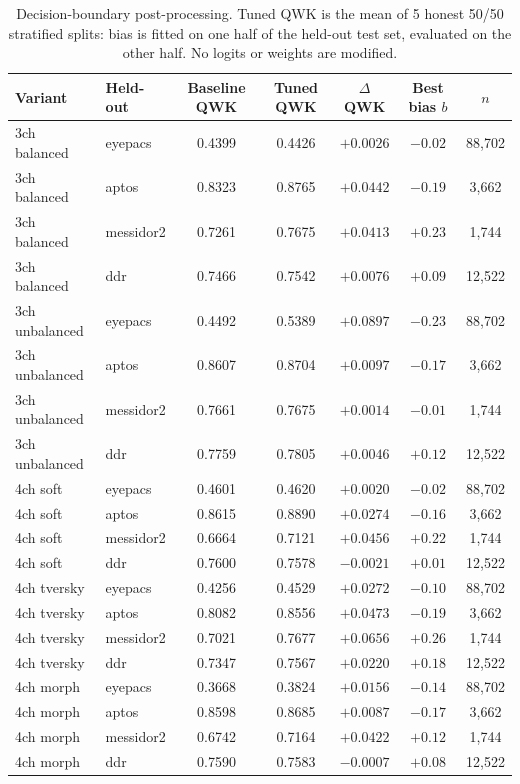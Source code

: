 \documentclass[11pt]{article}
\begin{document}
\begin{table}[ht]
\centering
\small
\begin{tabular}{llccccc}
\toprule
Variant & Held-out & Baseline QWK & Tuned QWK & $\Delta$QWK & Best bias $b$ & $n$ \\
\midrule
3ch balanced   & eyepacs   & 0.4399 & 0.4426 & $+0.0026$ & $-0.02$ & 88{,}702 \\
3ch balanced   & aptos     & 0.8323 & 0.8765 & $+0.0442$ & $-0.19$ &  3{,}662 \\
3ch balanced   & messidor2 & 0.7261 & 0.7675 & $+0.0413$ & $+0.23$ &  1{,}744 \\
3ch balanced   & ddr       & 0.7466 & 0.7542 & $+0.0076$ & $+0.09$ & 12{,}522 \\
3ch unbalanced & eyepacs   & 0.4492 & 0.5389 & $+0.0897$ & $-0.23$ & 88{,}702 \\
3ch unbalanced & aptos     & 0.8607 & 0.8704 & $+0.0097$ & $-0.17$ &  3{,}662 \\
3ch unbalanced & messidor2 & 0.7661 & 0.7675 & $+0.0014$ & $-0.01$ &  1{,}744 \\
3ch unbalanced & ddr       & 0.7759 & 0.7805 & $+0.0046$ & $+0.12$ & 12{,}522 \\
4ch soft       & eyepacs   & 0.4601 & 0.4620 & $+0.0020$ & $-0.02$ & 88{,}702 \\
4ch soft       & aptos     & 0.8615 & 0.8890 & $+0.0274$ & $-0.16$ &  3{,}662 \\
4ch soft       & messidor2 & 0.6664 & 0.7121 & $+0.0456$ & $+0.22$ &  1{,}744 \\
4ch soft       & ddr       & 0.7600 & 0.7578 & $-0.0021$ & $+0.01$ & 12{,}522 \\
4ch tversky    & eyepacs   & 0.4256 & 0.4529 & $+0.0272$ & $-0.10$ & 88{,}702 \\
4ch tversky    & aptos     & 0.8082 & 0.8556 & $+0.0473$ & $-0.19$ &  3{,}662 \\
4ch tversky    & messidor2 & 0.7021 & 0.7677 & $+0.0656$ & $+0.26$ &  1{,}744 \\
4ch tversky    & ddr       & 0.7347 & 0.7567 & $+0.0220$ & $+0.18$ & 12{,}522 \\
4ch morph      & eyepacs   & 0.3668 & 0.3824 & $+0.0156$ & $-0.14$ & 88{,}702 \\
4ch morph      & aptos     & 0.8598 & 0.8685 & $+0.0087$ & $-0.17$ &  3{,}662 \\
4ch morph      & messidor2 & 0.6742 & 0.7164 & $+0.0422$ & $+0.12$ &  1{,}744 \\
4ch morph      & ddr       & 0.7590 & 0.7583 & $-0.0007$ & $+0.08$ & 12{,}522 \\
\bottomrule
\end{tabular}
\caption{Decision-boundary post-processing. Tuned QWK is the mean of 5 honest 50/50 stratified splits: bias is fitted on one half of the held-out test set, evaluated on the other half. No logits or weights are modified.}
\label{tab:decision-boundary}
\end{table}
\end{document}
